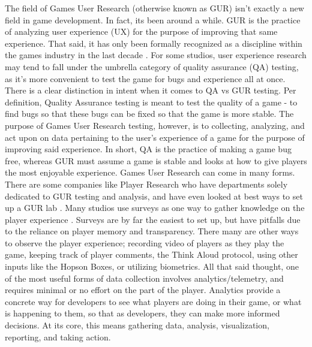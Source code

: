 \documentclass[journal]{IEEEtran}
\begin{document}
The field of Games User Research (otherwise known as GUR) isn’t exactly a new field in game development. In fact, its been around a while. GUR is the practice of analyzing user experience (UX) for the purpose of improving that same experience. That said, it has only been formally recognized as a discipline within the games industry in the last decade \cite{gur-ch2}. For some studios, user experience research may tend to fall under the umbrella category of quality assurance (QA) testing, as it’s more convenient to test the game for bugs and experience all at once. There is a clear distinction in intent when it comes to QA vs GUR testing. Per definition, Quality Assurance testing is meant to test the quality of a game - to find bugs so that these bugs can be fixed so that the game is more stable. The purpose of Games User Research testing, however, is to collecting, analyzing, and act upon on data pertaining to the user’s experience of a game for the purpose of improving said experience. In short, QA is the practice of making a game bug free, whereas GUR must assume a game is stable and looks at how to give players the most enjoyable experience.
Games User Research can come in many forms. There are some companies like Player Research who have departments solely dedicated to GUR testing and analysis, and have even looked at best ways to set up a GUR lab \cite{gur-ch6}. Many studios use surveys as one way to gather knowledge on the player experience \cite{gur-ch9}. Surveys are by far the easiest to set up, but have pitfalls due to the reliance on player memory and transparency. There many are other ways to observe the player experience; recording video of players as they play the game, keeping track of player comments, the Think Aloud protocol, using other inputs like the Hopson Boxes, or utilizing biometrics. \cite{gur-ch11} \cite{gur-ch12} \cite{gur-ch16} All that said thought, one of the most useful forms of data collection involves analytics/telemetry, and requires minimal or no effort on the part of the player. \cite{gur-ch19} Analytics provide a concrete way for developers to see what players are doing in their game, or what is happening to them, so that as developers, they can make more informed decisions. At its core, this means gathering data, analysis, visualization, reporting, and taking action. \cite{gur-ch19}
\end{document}
